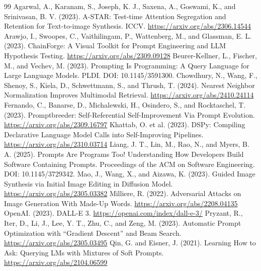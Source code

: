 \documentclass[11pt]{article}
\begin{document}
\begin{thebibliography}{99}
 Agarwal, A., Karanam, S., Joseph, K. J., Saxena, A., Goswami, K., and Srinivasan, B. V. (2023). A-STAR: Test-time Attention Segregation and Retention for Text-to-image Synthesis. ICCV. \url{https://arxiv.org/abs/2306.14544}
 Arawjo, I., Swoopes, C., Vaithilingam, P., Wattenberg, M., and Glassman, E. L. (2023). ChainForge: A Visual Toolkit for Prompt Engineering and LLM Hypothesis Testing. \url{https://arxiv.org/abs/2309.09128}
 Beurer-Kellner, L., Fischer, M., and Vechev, M. (2023). Prompting Is Programming: A Query Language for Large Language Models. PLDI. DOI: 10.1145/3591300.
 Chowdhury, N., Wang, F., Shenoy, S., Kiela, D., Schwettmann, S., and Thrush, T. (2024). Nearest Neighbor Normalization Improves Multimodal Retrieval. \url{https://arxiv.org/abs/2410.24114}
 Fernando, C., Banarse, D., Michalewski, H., Osindero, S., and Rocktaschel, T. (2023). Promptbreeder: Self-Referential Self-Improvement Via Prompt Evolution. \url{https://arxiv.org/abs/2309.16797}
 Khattab, O. et al. (2023). DSPy: Compiling Declarative Language Model Calls into Self-Improving Pipelines. \url{https://arxiv.org/abs/2310.03714}
 Liang, J. T., Lin, M., Rao, N., and Myers, B. A. (2025). Prompts Are Programs Too! Understanding How Developers Build Software Containing Prompts. Proceedings of the ACM on Software Engineering. DOI: 10.1145/3729342.
 Mao, J., Wang, X., and Aizawa, K. (2023). Guided Image Synthesis via Initial Image Editing in Diffusion Model. \url{https://arxiv.org/abs/2305.03382}
 Milliere, R. (2022). Adversarial Attacks on Image Generation With Made-Up Words. \url{https://arxiv.org/abs/2208.04135}
 OpenAI. (2023). DALL-E 3. \url{https://openai.com/index/dall-e-3/}
 Pryzant, R., Iter, D., Li, J., Lee, Y. T., Zhu, C., and Zeng, M. (2023). Automatic Prompt Optimization with ``Gradient Descent'' and Beam Search. \url{https://arxiv.org/abs/2305.03495}
 Qin, G. and Eisner, J. (2021). Learning How to Ask: Querying LMs with Mixtures of Soft Prompts. \url{https://arxiv.org/abs/2104.06599}

\end{thebibliography}
\end{document}
